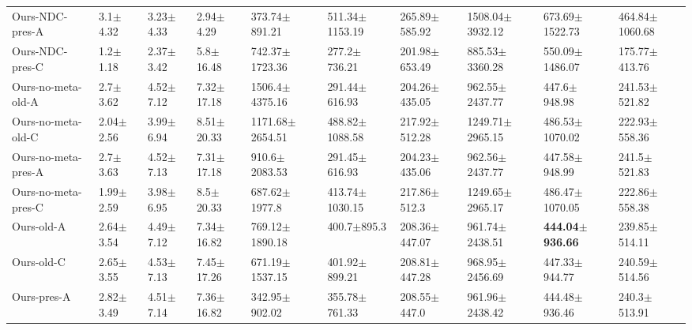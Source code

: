 \begin{tabular}{llllllllll}
Ours-NDC-pres-A     &            3.1$\pm$4.32 &           3.23$\pm$4.33 &           2.94$\pm$4.29 &           373.74$\pm$891.21 &          511.34$\pm$1153.19 &           265.89$\pm$585.92 &          1508.04$\pm$3932.12 &          673.69$\pm$1522.73 &          464.84$\pm$1060.68 \\
Ours-NDC-pres-C     &            1.2$\pm$1.18 &           2.37$\pm$3.42 &           5.8$\pm$16.48 &          742.37$\pm$1723.36 &            277.2$\pm$736.21 &           201.98$\pm$653.49 &           885.53$\pm$3360.28 &          550.09$\pm$1486.07 &           175.77$\pm$413.76 \\
Ours-no-meta-old-A  &            2.7$\pm$3.62 &           4.52$\pm$7.12 &          7.32$\pm$17.18 &          1506.4$\pm$4375.16 &           291.44$\pm$616.93 &           204.26$\pm$435.05 &           962.55$\pm$2437.77 &            447.6$\pm$948.98 &           241.53$\pm$521.82 \\
Ours-no-meta-old-C  &           2.04$\pm$2.56 &           3.99$\pm$6.94 &          8.51$\pm$20.33 &         1171.68$\pm$2654.51 &          488.82$\pm$1088.58 &           217.92$\pm$512.28 &          1249.71$\pm$2965.15 &          486.53$\pm$1070.02 &           222.93$\pm$558.36 \\
Ours-no-meta-pres-A &            2.7$\pm$3.63 &           4.52$\pm$7.13 &          7.31$\pm$17.18 &           910.6$\pm$2083.53 &           291.45$\pm$616.93 &           204.23$\pm$435.06 &           962.56$\pm$2437.77 &           447.58$\pm$948.99 &            241.5$\pm$521.83 \\
Ours-no-meta-pres-C &           1.99$\pm$2.59 &           3.98$\pm$6.95 &           8.5$\pm$20.33 &           687.62$\pm$1977.8 &          413.74$\pm$1030.15 &            217.86$\pm$512.3 &          1249.65$\pm$2965.17 &          486.47$\pm$1070.05 &           222.86$\pm$558.38 \\
Ours-old-A          &           2.64$\pm$3.54 &           4.49$\pm$7.12 &          7.34$\pm$16.82 &          769.12$\pm$1890.18 &             400.7$\pm$895.3 &           208.36$\pm$447.07 &           961.74$\pm$2438.51 &  \textbf{444.04$\pm$936.66} &           239.85$\pm$514.11 \\
Ours-old-C          &           2.65$\pm$3.55 &           4.53$\pm$7.13 &          7.45$\pm$17.26 &          671.19$\pm$1537.15 &           401.92$\pm$899.21 &           208.81$\pm$447.28 &           968.95$\pm$2456.69 &           447.33$\pm$944.77 &           240.59$\pm$514.56 \\
Ours-pres-A         &           2.82$\pm$3.49 &           4.51$\pm$7.14 &          7.36$\pm$16.82 &           342.95$\pm$902.02 &           355.78$\pm$761.33 &            208.55$\pm$447.0 &           961.96$\pm$2438.42 &           444.48$\pm$936.46 &            240.3$\pm$513.91 \\

\end{tabular}
